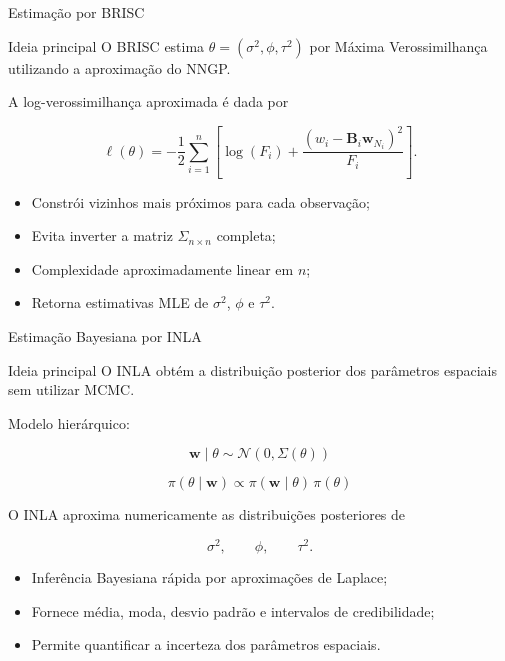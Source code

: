 \documentclass{beamer}
\begin{document}
\begin{frame}{Estimação por BRISC}

\begin{block}{Ideia principal}
O BRISC estima $\theta=(\sigma^2,\phi,\tau^2)$ por Máxima Verossimilhança utilizando a aproximação do NNGP.
\end{block}

A log-verossimilhança aproximada é dada por

\[
\ell(\theta)=
-\frac{1}{2}
\sum_{i=1}^{n}
\left[
\log(F_i)+
\frac{(w_i-\mathbf{B}_i\mathbf{w}_{N_i})^2}{F_i}
\right].
\]

\begin{itemize}
    \item Constrói vizinhos mais próximos para cada observação;
    \item Evita inverter a matriz $\Sigma_{n\times n}$ completa;
    \item Complexidade aproximadamente linear em $n$;
    \item Retorna estimativas MLE de $\sigma^2$, $\phi$ e $\tau^2$.
\end{itemize}

\end{frame}

\begin{frame}{Estimação Bayesiana por INLA}

\begin{block}{Ideia principal}
O INLA obtém a distribuição posterior dos parâmetros espaciais sem utilizar MCMC.
\end{block}

Modelo hierárquico:

\[
\mathbf{w}\mid\theta
\sim
\mathcal{N}(0,\Sigma(\theta))
\]

\[
\pi(\theta\mid\mathbf{w})
\propto
\pi(\mathbf{w}\mid\theta)\,
\pi(\theta)
\]

O INLA aproxima numericamente as distribuições posteriores de

\[
\sigma^2,\qquad
\phi,\qquad
\tau^2.
\]

\begin{itemize}
    \item Inferência Bayesiana rápida por aproximações de Laplace;
    \item Fornece média, moda, desvio padrão e intervalos de credibilidade;
    \item Permite quantificar a incerteza dos parâmetros espaciais.
\end{itemize}

\end{frame}
\end{document}
